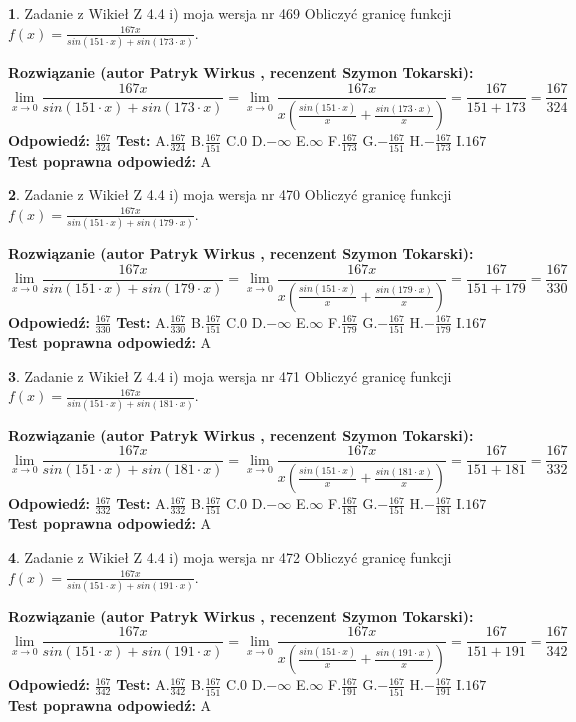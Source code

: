 \documentclass[12pt, a4paper]{article}
\theoremstyle{definition} %
\newtheorem{zad}{}
\newcommand{\zadStart}[1]{\begin{zad}#1\newline}
\newcommand{\zadStop}{\end{zad}}
\newcommand{\rozwStart}[2]{\noindent \textbf{Rozwiązanie (autor #1 , recenzent #2): }\newline}
\newcommand{\rozwStop}{\newline}
\newcommand{\odpStart}{\noindent \textbf{Odpowiedź:}\newline}
\newcommand{\odpStop}{\newline}
\newcommand{\testStart}{\noindent \textbf{Test:}\newline}
\newcommand{\testStop}{\newline}
\newcommand{\kluczStart}{\noindent \textbf{Test poprawna odpowiedź:}\newline}
\newcommand{\kluczStop}{\newline}
\begin{document}
\zadStart{Zadanie z Wikieł Z 4.4 i) moja wersja nr 469}
Obliczyć granicę funkcji $f(x)=\frac{167x}{sin(151\cdot x) +sin(173\cdot x)}$.
\zadStop
\rozwStart{Patryk Wirkus}{Szymon Tokarski}
$$\lim\limits_{x\to 0}\frac{167x}{sin(151\cdot x) +sin(173\cdot x)}=\lim\limits_{x\to 0}\frac{167x}{x(\frac{sin(151\cdot x)}{x}+\frac{sin(173\cdot x)}{x})}=\frac{167}{151+173} = \frac{167}{324}$$
\rozwStop
\odpStart
$\frac{167}{324}$
\odpStop
\testStart
A.$\frac{167}{324}$
B.$\frac{167}{151}$
C.$0$
D.$-\infty$
E.$\infty$
F.$\frac{167}{173}$
G.$-\frac{167}{151}$
H.$-\frac{167}{173}$
I.$167$
\testStop
\kluczStart
A
\kluczStop



\zadStart{Zadanie z Wikieł Z 4.4 i) moja wersja nr 470}
Obliczyć granicę funkcji $f(x)=\frac{167x}{sin(151\cdot x) +sin(179\cdot x)}$.
\zadStop
\rozwStart{Patryk Wirkus}{Szymon Tokarski}
$$\lim\limits_{x\to 0}\frac{167x}{sin(151\cdot x) +sin(179\cdot x)}=\lim\limits_{x\to 0}\frac{167x}{x(\frac{sin(151\cdot x)}{x}+\frac{sin(179\cdot x)}{x})}=\frac{167}{151+179} = \frac{167}{330}$$
\rozwStop
\odpStart
$\frac{167}{330}$
\odpStop
\testStart
A.$\frac{167}{330}$
B.$\frac{167}{151}$
C.$0$
D.$-\infty$
E.$\infty$
F.$\frac{167}{179}$
G.$-\frac{167}{151}$
H.$-\frac{167}{179}$
I.$167$
\testStop
\kluczStart
A
\kluczStop



\zadStart{Zadanie z Wikieł Z 4.4 i) moja wersja nr 471}
Obliczyć granicę funkcji $f(x)=\frac{167x}{sin(151\cdot x) +sin(181\cdot x)}$.
\zadStop
\rozwStart{Patryk Wirkus}{Szymon Tokarski}
$$\lim\limits_{x\to 0}\frac{167x}{sin(151\cdot x) +sin(181\cdot x)}=\lim\limits_{x\to 0}\frac{167x}{x(\frac{sin(151\cdot x)}{x}+\frac{sin(181\cdot x)}{x})}=\frac{167}{151+181} = \frac{167}{332}$$
\rozwStop
\odpStart
$\frac{167}{332}$
\odpStop
\testStart
A.$\frac{167}{332}$
B.$\frac{167}{151}$
C.$0$
D.$-\infty$
E.$\infty$
F.$\frac{167}{181}$
G.$-\frac{167}{151}$
H.$-\frac{167}{181}$
I.$167$
\testStop
\kluczStart
A
\kluczStop



\zadStart{Zadanie z Wikieł Z 4.4 i) moja wersja nr 472}
Obliczyć granicę funkcji $f(x)=\frac{167x}{sin(151\cdot x) +sin(191\cdot x)}$.
\zadStop
\rozwStart{Patryk Wirkus}{Szymon Tokarski}
$$\lim\limits_{x\to 0}\frac{167x}{sin(151\cdot x) +sin(191\cdot x)}=\lim\limits_{x\to 0}\frac{167x}{x(\frac{sin(151\cdot x)}{x}+\frac{sin(191\cdot x)}{x})}=\frac{167}{151+191} = \frac{167}{342}$$
\rozwStop
\odpStart
$\frac{167}{342}$
\odpStop
\testStart
A.$\frac{167}{342}$
B.$\frac{167}{151}$
C.$0$
D.$-\infty$
E.$\infty$
F.$\frac{167}{191}$
G.$-\frac{167}{151}$
H.$-\frac{167}{191}$
I.$167$
\testStop
\kluczStart
A
\kluczStop
\end{document}
